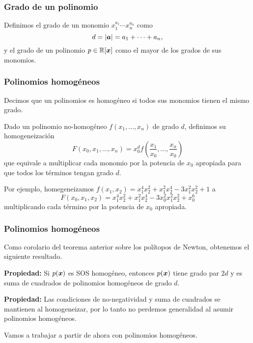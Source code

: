 \documentclass[aspectratio=169,12pt,spanish]{beamer}
\begin{document}

\begin{frame}
\frametitle{Grado de un polinomio}

Definimos el grado de un monomio $x_1^{a_1} \cdots x_n^{a_n}$ como
$$d = |\bm{a}| = a_1 + \dots + a_n,$$
y el grado de un polinomio $p \in \mathbb{R}[\bm{x}]$ como el mayor de los grados de sus monomios.


\end{frame}


\begin{frame}
\frametitle{Polinomios homogéneos}

Decimos que un polinomios es homogéneo si todos sus monomios tienen el mismo grado.

Dado un polinomio no-homogéneo $f(x_1, \dots, x_n)$ de grado $d$, definimos su homogeneización
$$F(x_0, x_1, \dots, x_n) = x_0^d f\left(\frac{x_1}{x_0}, \dots, \frac{x_n}{x_0}\right)$$
que equivale a multiplicar cada monomio por la potencia de $x_0$ apropiada para que todos los términos tengan grado $d$.


Por ejemplo, homegeneizamos $f(x_1, x_2) = x_1^4x_2^2 + x_1^2x_2^4 - 3x_1^2x_2^2+1$ a
$$
F(x_0, x_1, x_2) = x_1^4x_2^2 + x_1^2x_2^4 - 3x_0^2x_1^2x_2^2+x_0^6
$$
multiplicando cada término por la potencia de $x_0$ apropiada.

\end{frame}



\begin{frame}
\frametitle{Polinomios homogéneos}


Como corolario del teorema anterior sobre los polítopos de Newton, obtenemos el siguiente resultado.

\textbf{Propiedad:} Si $p(\bm{x})$ es SOS homogéneo, entonces $p(\bm{x})$ tiene grado par $2d$ y es suma de cuadrados de polinomios homogéneos de grado $d$.

\textbf{Propiedad:} Las condiciones de no-negatividad y suma de cuadrados se mantienen al homogeneizar, por lo tanto no perdemos generalidad al asumir polinomios homogéneos.


Vamos a trabajar a partir de ahora con polinomios homogéneos.

\end{frame}
\end{document}
